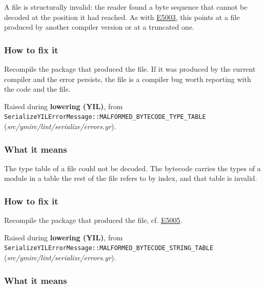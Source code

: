 A  file is structurally invalid: the reader found a byte sequence that cannot be decoded at the position it had reached. As with \hyperref[sec:codes:e5003]{E5003}, this points at a file produced by another compiler version or at a truncated one.

\subsubsection*{How to fix it}

Recompile the package that produced the file. If it was produced by the current compiler and the error persists, the file is a compiler bug worth reporting with the code and the file.

\label{sec:codes:e5006}

Raised during \textbf{lowering (YIL)}, from \texttt{SerializeYILErrorMessage::\allowbreak{}MALFORMED\_\allowbreak{}BYTECODE\_\allowbreak{}TYPE\_\allowbreak{}TABLE} (\textit{src/\allowbreak{}ymirc/\allowbreak{}lint/\allowbreak{}serialize/\allowbreak{}errors.yr}).

\subsubsection*{What it means}

The type table of a  file could not be decoded. The bytecode carries the types of a module in a table the rest of the file refers to by index, and that table is invalid.

\subsubsection*{How to fix it}

Recompile the package that produced the file, cf. \hyperref[sec:codes:e5005]{E5005}.

\label{sec:codes:e5007}

Raised during \textbf{lowering (YIL)}, from \texttt{SerializeYILErrorMessage::\allowbreak{}MALFORMED\_\allowbreak{}BYTECODE\_\allowbreak{}STRING\_\allowbreak{}TABLE} (\textit{src/\allowbreak{}ymirc/\allowbreak{}lint/\allowbreak{}serialize/\allowbreak{}errors.yr}).

\subsubsection*{What it means}

